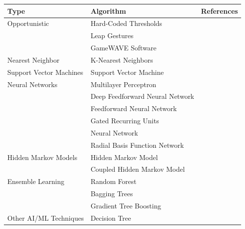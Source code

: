 \begin{table}[!b]
    \centering
    \footnotesize
    \begin{tabular}{llp{3.1cm}}
        \toprule
        \textbf{Type} & \textbf{Algorithm} & \textbf{References} \\
        \midrule
        Opportunistic & Hard-Coded Thresholds & \cite{Cai:2019,Caputo:2015,Fu:2016,Galea:2018,Sadik:2017,Theofanidis:2017,Tran:2016,Yang:2017,Yao:2017,Yu:2018,Zhou:2018b} \\
         & Leap Gestures & \cite{Caputo:2015,Chatterjee:2015,Daniels:2014,Liang:2017,Mendez:2018,Sadik:2017,Theofanidis:2017,Tran:2016,Yao:2017,Zocco:2015} \\
         & GameWAVE Software & \cite{Liang:2017} \\
        \midrule
        Nearest Neighbor & K-Nearest Neighbors & \cite{Caputo:2017,Chiang:2017,Clark:2016,Daniels:2014,Filho:2018,GomezDonoso:2017,Li:2019,Taranta:2017,Thaweesitthichat:2018,Stinghen:2018} \\
        \midrule
        Support Vector Machines & Support Vector Machine & \cite{Ferreira:2019,Filho:2018,Stinghen:2018,Jiang:2018,Kiselev:2019,Lopez:2015,Marin:2016,Park:2019,Simos:2016} \\
        \midrule
        Neural Networks & Multilayer Perceptron & \cite{Mapari:2016,Togootogtokh:2018} \\
         & Deep Feedforward Neural Network & \cite{Schioppo:2019} \\
         & Feedforward Neural Network & \cite{DePrisco:2016} \\
         & Gated Recurring Units & \cite{Thaweesitthichat:2018} \\
         & Neural Network & \cite{Jiang:2018} \\
         & Radial Basis Function Network & \cite{Zeng:2018} \\
        \midrule
        Hidden Markov Models & Hidden Markov Model & \cite{Kumar:2017a,Kumar:2018,Volioti:2018,Zou:2017} \\
         & Coupled Hidden Markov Model & \cite{Kumar:2017b} \\
        \midrule
        Ensemble Learning & Random Forest & \cite{Marin:2016,Schioppo:2019} \\
         & Bagging Trees & \cite{Jiang:2018} \\
         & Gradient Tree Boosting & \cite{Kiselev:2019} \\
        \midrule
        Other AI/ML Techniques & Decision Tree & \cite{Filho:2018,Stinghen:2018,Zhou:2018b} \\

\end{tabular}
\end{table}
